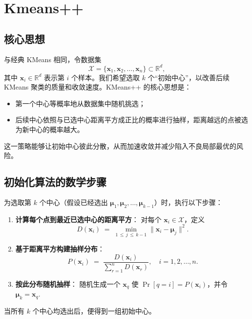 \documentclass[12pt]{article}  %
\begin{document}
\section{Kmeans++}
\subsection{核心思想}
与经典 KMeans 相同，令数据集
\[
  \mathcal{X} = \bigl\{ \mathbf{x}_1, \mathbf{x}_2, \ldots, \mathbf{x}_n \bigr\} \subset \mathbb{R}^d,
\]
其中 \(\mathbf{x}_i \in \mathbb{R}^d\) 表示第 \(i\) 个样本。我们希望选取 \(k\) 个“初始中心”，以改善后续 KMeans 聚类的质量和收敛速度。KMeans++ 的核心思想是：
\begin{itemize}
    \item 第一个中心等概率地从数据集中随机挑选；
    \item 后续中心依照与已选中心距离平方成正比的概率进行抽样，距离越远的点被选为新中心的概率越大。
\end{itemize}
这一策略能够让初始中心彼此分散，从而加速收敛并减少陷入不良局部最优的风险。

\subsection{初始化算法的数学步骤}
为选取第 \(k\) 个中心（假设已经选出 \(\boldsymbol{\mu}_1, \boldsymbol{\mu}_2, \ldots, \boldsymbol{\mu}_{k-1}\)）时，执行以下步骤：
\begin{enumerate}
    \item \textbf{计算每个点到最近已选中心的距离平方}：  
    对每个 \(\mathbf{x}_i \in \mathcal{X}\)，定义
    \[
      D(\mathbf{x}_i) 
      \;=\;
      \min_{1 \,\le\, j \,\le\, k-1}\|\mathbf{x}_i - \boldsymbol{\mu}_j\|^2.
    \]
    \item \textbf{基于距离平方构建抽样分布}：  
    \[
      P(\mathbf{x}_i)
      \;=\;
      \frac{D(\mathbf{x}_i)}{\sum_{r=1}^n D(\mathbf{x}_r)},
      \quad i = 1,2,\ldots,n.
    \]
    \item \textbf{按此分布随机抽样}：  
    随机生成一个 \(\mathbf{x}_q\) 使
    \(\Pr[q = i] = P(\mathbf{x}_i)\)，并令
    \(\boldsymbol{\mu}_k = \mathbf{x}_q.\)
\end{enumerate}
当所有 \(k\) 个中心均选出后，便得到一组初始中心。
\end{document}
